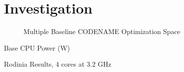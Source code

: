 \section{Investigation}

\begin{figure}
\centering

\caption{Multiple Baseline CODENAME Optimization Space}
\label{fig:multibaseline-investigation}
\end{figure}

\begin{table}
\centering

\caption{Base CPU Power (W)}
\end{table} 

\begin{table}
\centering

\caption{Rodinia Results, 4 cores at 3.2 GHz}
\end{table} 

